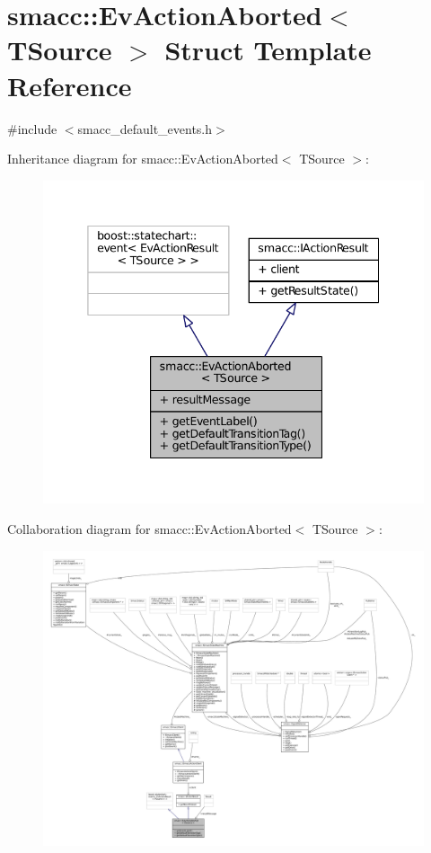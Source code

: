 \hypertarget{structsmacc_1_1EvActionAborted}{}\section{smacc\+:\+:Ev\+Action\+Aborted$<$ T\+Source $>$ Struct Template Reference}
\label{structsmacc_1_1EvActionAborted}


{\ttfamily \#include $<$smacc\+\_\+default\+\_\+events.\+h$>$}



Inheritance diagram for smacc\+:\+:Ev\+Action\+Aborted$<$ T\+Source $>$\+:
\nopagebreak
\begin{figure}[H]
\begin{center}
\leavevmode
\includegraphics[width=338pt]{structsmacc_1_1EvActionAborted__inherit__graph}
\end{center}
\end{figure}


Collaboration diagram for smacc\+:\+:Ev\+Action\+Aborted$<$ T\+Source $>$\+:
\nopagebreak
\begin{figure}[H]
\begin{center}
\leavevmode
\includegraphics[width=350pt]{structsmacc_1_1EvActionAborted__coll__graph}
\end{center}
\end{figure}
